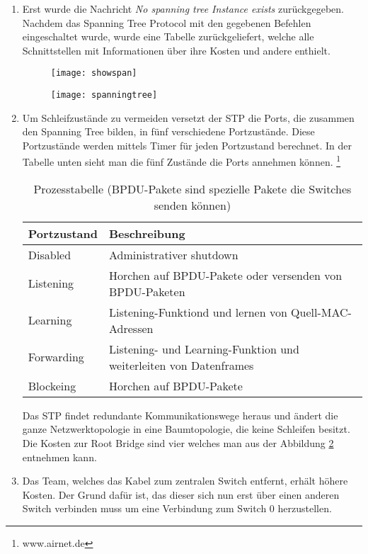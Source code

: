 \documentclass{scrartcl}
\begin{document}
  \renewcommand{\labelenumi}{\alph{enumi})}
  \begin{enumerate}
  \item
  Erst wurde die Nachricht \textit{No spanning tree Instance exists} zurückgegeben. Nachdem das Spanning Tree Protocol mit den gegebenen Befehlen eingeschaltet wurde, wurde eine Tabelle zurückgeliefert, welche alle Schnittstellen mit Informationen über ihre Kosten und andere enthielt. 
  
  \begin{figure}
    \texttt{[image: showspan]}
    \label{fig:showspan}
  \end{figure}
  
  \begin{figure}
    \texttt{[image: spanningtree]}
    \label{fig:spanningtree}
  \end{figure}
  
  \item
  Um Schleifzustände zu vermeiden versetzt der STP die Ports, die zusammen den Spanning Tree bilden, in fünf verschiedene Portzustände. Diese Portzustände werden mittels Timer für jeden Portzustand berechnet. In der Tabelle unten sieht man die fünf Zustände die Ports annehmen können. \footnote{www.airnet.de}
  
  \begin{table}
  \begin{tabular}{|l|l}
      \textbf{Portzustand} & \textbf{Beschreibung} \\ \hline
		 Disabled     & Administrativer shutdown \\
		 Listening    & Horchen auf BPDU-Pakete oder versenden von BPDU-Paketen \\
		 Learning     & Listening-Funktiond und lernen von Quell-MAC-Adressen \\
		 Forwarding & Listening- und Learning-Funktion und weiterleiten von Datenframes\\
        Blockeing    & Horchen auf BPDU-Pakete
    \end{tabular}
     \caption{Prozesstabelle (BPDU-Pakete sind spezielle Pakete die Switches senden können)}
    \end{table}
    
    Das STP findet redundante Kommunikationswege heraus und ändert die ganze Netzwerktopologie in eine Baumtopologie, die keine Schleifen besitzt. Die Kosten zur Root Bridge sind vier welches man aus der Abbildung \ref{fig:spanningtree} entnehmen kann.
    
    \item
    Das Team, welches das Kabel zum zentralen Switch entfernt, erhält höhere Kosten. Der Grund dafür ist, das dieser sich nun erst über einen anderen Switch verbinden muss um eine Verbindung zum Switch 0 herzustellen.
    

\end{enumerate}
\end{document}
